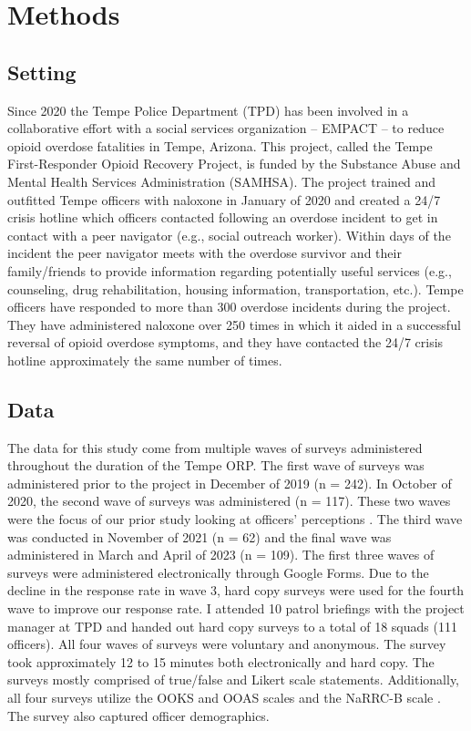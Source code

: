 \section{Methods}
\subsection{Setting}

Since 2020 the Tempe Police Department (TPD) has been involved in a collaborative effort with a social services organization – EMPACT – to reduce opioid overdose fatalities in Tempe, Arizona. This project, called the Tempe First-Responder Opioid Recovery Project, is funded by the Substance Abuse and Mental Health Services Administration (SAMHSA). The project trained and outfitted Tempe officers with naloxone in January of 2020 and created a 24/7 crisis hotline which officers contacted following an overdose incident to get in contact with a peer navigator (e.g., social outreach worker). Within days of the incident the peer navigator meets with the overdose survivor and their family/friends to provide information regarding potentially useful services (e.g., counseling, drug rehabilitation, housing information, transportation, etc.). Tempe officers have responded to more than 300 overdose incidents during the project. They have administered naloxone over 250 times in which it aided in a successful reversal of opioid overdose symptoms, and they have contacted the 24/7 crisis hotline approximately the same number of times. 

\subsection{Data}

The data for this study come from multiple waves of surveys administered throughout the duration of the Tempe ORP. The first wave of surveys was administered prior to the project in December of 2019 (n = 242). In October of 2020, the second wave of surveys was administered (n = 117). These two waves were the focus of our prior study looking at officers’ perceptions \parencite{white_narcan_2021}. The third wave was conducted in November of 2021 (n = 62) and the final wave was administered in March and April of 2023 (n = 109). The first three waves of surveys were administered electronically through Google Forms. Due to the decline in the response rate in wave 3, hard copy surveys were used for the fourth wave to improve our response rate.  I attended 10 patrol briefings with the project manager at TPD and handed out hard copy surveys to a total of 18 squads (111 officers). All four waves of surveys were voluntary and anonymous. The survey took approximately 12 to 15 minutes both electronically and hard copy. The surveys mostly comprised of true/false and Likert scale statements. Additionally, all four surveys utilize the OOKS and OOAS scales \parencite{williams_development_2013} and the NaRRC-B scale \parencite{winograd_concerns_2019}. The survey also captured officer demographics.

